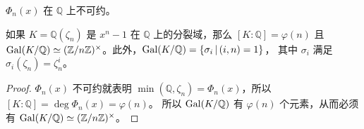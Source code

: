 \begin{theorem}
  $\Phi_n(x)$ 在 $\mathbb{Q}$ 上不可约。
\end{theorem}

\begin{corollary}
  如果 $K=\mathbb{Q}(\zeta_n)$ 是 $x^n-1$ 在 $\mathbb{Q}$ 上的分裂域，那么 $[K:\mathbb{Q}]=\varphi(n)$
  且 $\operatorname{Gal}(K/\mathbb{Q})\simeq (\mathbb{Z}/n \mathbb{Z})^\times$。此外，$\operatorname{Gal}(K/\mathbb{Q})=\{\sigma_i\,|\, (i,n)=1\}$，
  其中 $\sigma_i$ 满足 $\sigma_i(\zeta_n)=\zeta_n^i$。
\end{corollary}
\begin{proof}
  $\Phi_n(x)$ 不可约就表明 $\min(\mathbb{Q},\zeta_n)=\Phi_n(x)$，所以 $[K:\mathbb{Q}]=\deg\Phi_n(x)=\varphi(n)$。
  所以 $\operatorname{Gal}(K/\mathbb{Q})$ 有 $\varphi(n)$ 个元素，从而必须有 $\operatorname{Gal}(K/\mathbb{Q})\simeq (\mathbb{Z}/n \mathbb{Z})^\times$。
\end{proof}

